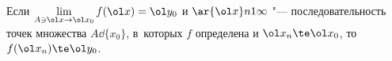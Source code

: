 
	 Если $\lim\limits_{A\ni \ol x\to \ol x_0}f(\ol x) = \ol y_0$ и $\ar {\ol x}n1\infty$ "--- последовательность точек множества $A\dd \{x_0\}$, в~которых
	 $f$ определена и $\ol x_n \te \ol x_0$, то $f(\ol x_n)\te \ol y_0$.
	 